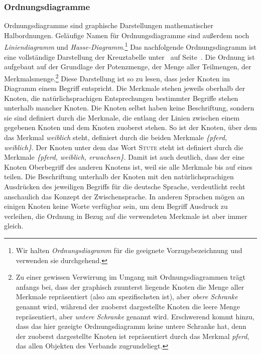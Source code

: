 \documentclass[pagesize,paper=A4,DIV=calc,fontsize=12pt,draft=false]{scrreprt}
\begin{document}
\subsubsection{Ordnungsdiagramme}

Ordnungsdiagramme sind graphische Darstellungen mathematischer Halbordnungen. 
Geläufige Namen für Ordnungsdiagramme sind außerdem noch \textit{Liniendiagramm} und \textit{Hasse-Diagramm}.\footnote{Wir halten \textit{Ordnungsdiagramm} für die geeignete Vorzugsbezeichnung und verwenden sie durchgehend.}
Das nachfolgende Ordnungsdiagramm ist eine vollständige Darstellung der Kreuztabelle unter\emph{~} auf Seite~\pageref{subsec:fba}.
Die Ordnung ist aufgebaut auf der Grundlage der Potenzmenge, der Menge aller Teilmengen, der Merkmalsmenge.\footnote{Zu einer gewissen Verwirrung im Umgang mit Ordnungsdiagrammen trägt anfangs bei, dass der graphisch zuunterst liegende Knoten die Menge aller Merkmale repräsentiert (also am spezifischsten ist), aber \textit{obere Schranke} genannt wird, während der zuoberst dargestellte Knoten die leere Menge repräsentiert, aber \textit{untere Schranke} genannt wird. 
Erschwerend kommt hinzu, dass das hier gezeigte Ordnungsdiagramm keine untere Schranke hat, denn der zuoberst dargestellte Knoten ist repräsentiert durch das Merkmal \textit{pferd}, das allen Objekten des Verbands zugrundeliegt.}
Diese Darstellung ist so zu lesen, dass jeder Knoten im Diagramm einem Begriff entspricht.
Die Merkmale stehen jeweils oberhalb der Knoten, die natürlichsprachigen Entsprechungen bestimmter Begriffe stehen unterhalb mancher Knoten.
Die Knoten selbst haben keine Beschriftung, sondern sie sind definiert durch die Merkmale, die entlang der Linien zwischen einem gegebenen Knoten und dem Knoten zuoberst stehen.
So ist der Knoten, über dem das Merkmal \textit{weiblich} steht, definiert durch die beiden Merkmale \textit{\{pferd, weiblich\}}.
Der Knoten unter dem das Wort \textsc{Stute} steht ist definiert durch die Merkmale \textit{\{pferd, weiblich, erwachsen\}}.
Damit ist auch deutlich, dass der eine Knoten Oberbegriff des anderen Knotens ist, weil sie alle Merkmale bis auf eines teilen.
Die Beschriftung unterhalb der Knoten mit den natürlichsprachigen Ausdrücken des jeweiligen Begriffs für die deutsche Sprache, verdeutlicht recht anschaulich das Konzept der Zwischensprache.
In anderen Sprachen mögen an einigen Knoten keine Worte verfügbar sein, um dem Begriff Ausdruck zu verleihen, die Ordnung in Bezug auf die verwendeten Merkmale ist aber immer gleich.
\end{document}
